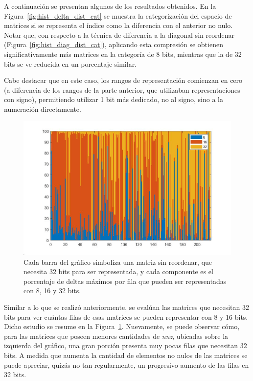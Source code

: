 A continuación se presentan algunos de los resultados obtenidos. En la Figura~\ref{fig:hist_delta_dist_cat} se muestra la categorización del espacio de matrices si se representa el índice como la diferencia con el anterior no nulo. Notar que, con respecto a la técnica de diferencia a la diagonal sin reordenar (Figura~\ref{fig:hist_diag_dist_cat}), aplicando esta compresión se obtienen significativamente más matrices en la categoría de 8 bits, mientras que la de 32 bits se ve reducida en un porcentaje similar.%



Cabe destacar que en este caso, los rangos de representación comienzan en cero (a diferencia de los rangos de la parte anterior, que utilizaban representaciones con signo),  permitiendo utilizar 1 bit más dedicado, no al signo, sino a la numeración directamente.

\begin{figure}
    \centering
    \includegraphics[width=.8\textwidth]{imagenes/chap4/delta_bar_row_porc_per_cat_32.jpg}
    \caption{Cada barra del gráfico simboliza una matriz sin reordenar, que necesita 32 bits para ser representada, y cada componente es el porcentaje de deltas máximos por fila que pueden ser representadas con 8, 16 y 32 bits.}
    \label{fig:delta_bar_row_porc_per_cat_32}
\end{figure}

Similar a lo que se realizó anteriormente, se evalúan las matrices que necesitan 32 bits para ver cuántas filas de esas matrices se pueden representar con 8 y 16 bits. Dicho estudio se resume en la Figura~\ref{fig:delta_bar_row_porc_per_cat_32}. Nuevamente, se puede observar cómo, para las matrices que poseen menores cantidades de \textit{nnz}, ubicadas sobre la izquierda del gráfico, una gran porción presenta muy pocas filas que necesitan 32 bits. A medida que aumenta la cantidad de elementos no nulos de las matrices se puede apreciar, quizás no tan regularmente, un progresivo aumento de las filas en 32 bits.


